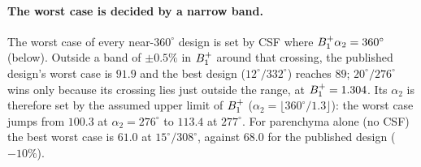\paragraph{The worst case is decided by a narrow band.} The worst case of every near-$360^\circ$ design
is set by CSF where $B_1^{+}\alpha_2=360^\circ$ (below). Outside a band of $\pm0.5\%$ in $B_1^{+}$ around that crossing, the
published design's worst case is $91.9$ and the best design ($12^\circ/332^\circ$) reaches $89$; $20^\circ/276^\circ$ wins only
because its crossing lies just outside the range, at $B_1^{+}=1.304$. Its $\alpha_2$ is therefore set by the
assumed upper limit of $B_1^{+}$ ($\alpha_2=\lfloor360^\circ/1.3\rfloor$): the worst case jumps from $100.3$ at $\alpha_2=276^\circ$ to
$113.4$ at $277^\circ$. For parenchyma alone (no CSF) the best worst case is $61.0$ at $15^\circ/308^\circ$, against
$68.0$ for the published design ($-10\%$).

